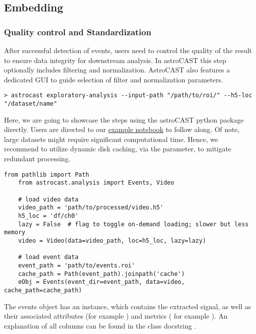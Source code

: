 \subsection{Embedding}\label{subsec:embedding}

\subsubsection{Quality control and Standardization}\label{subsubsec:quality-control}

After successful detection of events, users need to control the quality of the result to ensure data integrity for downstream analysis. In astroCAST this step optionally includes filtering and normalization. AstroCAST also features a dedicated \ac{GUI} to guide selection of filter and normalization parameters.

\begin{lstlisting}[style=bashStyle]
    > astrocast exploratory-analysis --input-path "/path/to/roi/" --h5-loc "/dataset/name"
\end{lstlisting}

Here, we are going to showcase the steps using the astroCAST python package directly. Users are directed to our \href{https://github.com/janreising/astroCAST/blob/9a474e5a5e643fa886b3edc5237328ca0a1d2a17/notebooks/examples/B%20-%20embedding.ipynb}{example notebook} to follow along. Of note, large datasets might require significant computational time. Hence, we recommend to utilize dynamic disk caching, via the \inlinepy{cache\_path} parameter, to mitigate redundant processing.

\begin{lstlisting}[style=pyStyle]
    from pathlib import Path
    from astrocast.analysis import Events, Video

    # load video data
    video_path = 'path/to/processed/video.h5'
    h5_loc = 'df/ch0'
    lazy = False  # flag to toggle on-demand loading; slower but less memory
    video = Video(data=video_path, loc=h5_loc, lazy=lazy)

    # load event data
    event_path = 'path/to/events.roi'
    cache_path = Path(event_path).joinpath('cache')
    eObj = Events(event_dir=event_path, data=video, cache_path=cache_path)
\end{lstlisting}

The events object has an  instance, which contains the extracted signal, as well as their associated attributes (for example ) and metrics ( for example ). An explanation of all columns can be found in the class docstring .

